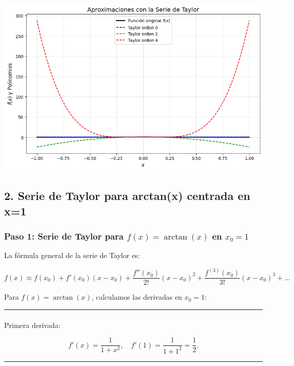 \documentclass[
  letterpaper,
  DIV=11,
  numbers=noendperiod]{scrartcl}
\makeatletter
\let\oldparagraph\paragraph
\renewcommand{\paragraph}{
    \@ifstar
      \xxxParagraphStar
      \xxxParagraphNoStar
  }
\newcommand{\xxxParagraphStar}[1]{\oldparagraph*{#1}\mbox{}}
\newcommand{\xxxParagraphNoStar}[1]{\oldparagraph{#1}\mbox{}}
\makeatother
\begin{document}
\includegraphics{Deber6_files/figure-pdf/cell-2-output-1.png}

\subsection{2. Serie de Taylor para arctan(x) centrada en
x=1}\label{serie-de-taylor-para-arctanx-centrada-en-x1}

\subsubsection{\texorpdfstring{Paso 1: Serie de Taylor para
\(f(x) = \arctan(x)\) en
\(x_0 = 1\)}{Paso 1: Serie de Taylor para f(x) = \textbackslash arctan(x) en x\_0 = 1}}\label{paso-1-serie-de-taylor-para-fx-arctanx-en-x_0-1}

La fórmula general de la serie de Taylor es:

\[
f(x) \approx f(x_0) + f'(x_0)(x - x_0) + \frac{f''(x_0)}{2!}(x - x_0)^2 + \frac{f^{(3)}(x_0)}{3!}(x - x_0)^3 + \dots
\]

Para \(f(x) = \arctan(x)\), calculamos las derivadas en \(x_0 = 1\):

\begin{center}\rule{0.5\linewidth}{0.5pt}\end{center}

\paragraph{Primera derivada:}\label{primera-derivada}

\[
f'(x) = \frac{1}{1 + x^2}, \quad f'(1) = \frac{1}{1 + 1^2} = \frac{1}{2}.
\]

\begin{center}\rule{0.5\linewidth}{0.5pt}\end{center}
\end{document}
